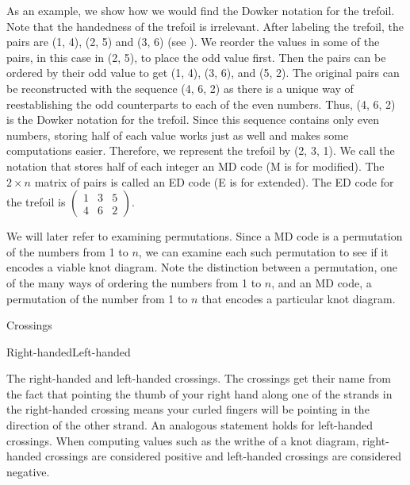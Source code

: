 \begin{paper}
As an example, we show how we would find the Dowker notation for the trefoil.
Note that the handedness of the trefoil is irrelevant.
After labeling the trefoil, the pairs are (1, 4), (2, 5) and (3, 6) (see
\figLabeled).
We reorder the values in some of the pairs, in this case in (2, 5), to place the
odd value first.
Then the pairs can be ordered by their odd value to get (1, 4), (3, 6), and
(5, 2).
The original pairs can be reconstructed with the sequence (4, 6, 2) as there is
a unique way of reestablishing the odd counterparts to each of the even numbers.
Thus, (4, 6, 2) is the Dowker notation for the trefoil.
Since this sequence contains only even numbers, storing half of each value works
just as well and makes some computations easier.
Therefore, we represent the trefoil by (2, 3, 1).
We call the notation that stores half of each integer an MD code (M is for
modified).
The $2\times n$ matrix of pairs is called an ED code (E is for extended).
The ED code for the trefoil is $\begin{pmatrix}1&3&5\\4&6&2\end{pmatrix}$.

We will later refer to examining permutations.
Since a MD code is a permutation of the numbers from 1 to $n$, we can examine
each such permutation to see if it encodes a viable knot diagram.
Note the distinction between a permutation, one of the many ways of ordering the
numbers from 1 to $n$, and an MD code, a permutation of the number from 1 to $n$
that encodes a particular knot diagram.\\

{\begin{center}Crossings\end{center}\vspace{-1em}
\hfill
{}\vspace{-0.5em}
\begin{center}Right-handed\hspace{0.37\columnwidth}Left-handed\end{center}
\vspace{-1em}}
{The right-handed and left-handed crossings.
The crossings get their name from the fact that pointing the thumb of your right
hand along one of the strands in the right-handed crossing means your curled
fingers will be pointing in the direction of the other strand.
An analogous statement holds for left-handed crossings.
When computing values such as the writhe of a knot diagram, right-handed
crossings are considered positive and left-handed crossings are considered
negative.\\}\\


\end{paper}
